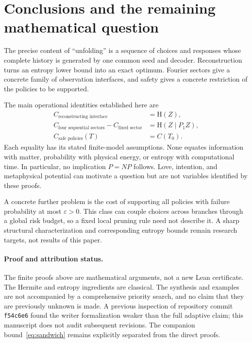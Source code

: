 \documentclass[11pt]{article}
\theoremstyle{remark}\newtheorem{remark}[theorem]{Remark}
\newcommand{\HH}{\mathrm H}
\begin{document}
\section{Conclusions and the remaining mathematical question}
The precise content of ``unfolding'' is a sequence of choices and responses
whose complete history is generated by one common seed and decoder. Reconstruction
turns an entropy lower bound into an exact optimum. Fourier sectors give a
concrete family of observation interfaces, and safety gives a concrete
restriction of the policies to be supported.

The main operational identities established here are
\[
 \boxed{\begin{aligned}
 C_{\text{reconstructing interface}}&=\HH(Z),\\
 C_{\text{four sequential sectors}}-C_{\text{fixed sector}}
     &=\HH(Z\mid P_1Z),\\
 C_{\text{safe policies}}(T)&=C(T_0).
 \end{aligned}}
\]
Each equality has its stated finite-model assumptions. None equates information
with matter, probability with physical energy, or entropy with computational
time. In particular, no implication $P=NP$ follows. Love, intention, and
metaphysical potential can motivate a question but are not variables identified
by these proofs.

A concrete further problem is the cost of supporting all policies with failure
probability at most $\varepsilon>0$. This class can couple choices across
branches through a global risk budget, so a fixed local pruning rule need not
describe it. A sharp structural characterization and corresponding entropy
bounds remain research targets, not results of this paper.

\paragraph{Proof and attribution status.}
The finite proofs above are mathematical arguments, not a new Lean certificate.
The Hermite and entropy ingredients are classical. The synthesis and examples
are not accompanied by a comprehensive priority search, and no claim that they
are previously unknown is made. A previous inspection of repository commit
\texttt{f54c6e6} found the writer formalization weaker than the full adaptive
claim; this manuscript does not audit subsequent revisions. The companion
bound~\eqref{eq:sandwich} remains explicitly separated from the direct proofs.
\end{document}
